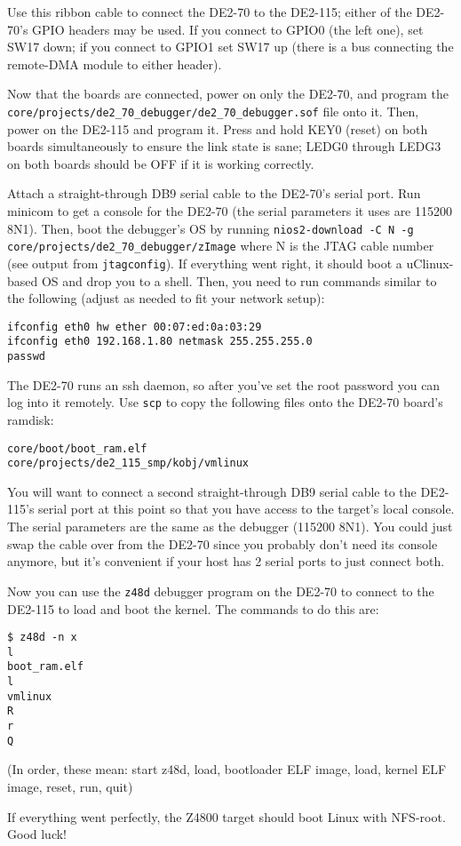 Use this ribbon cable to connect the DE2-70 to the DE2-115; either of the
DE2-70's GPIO headers may be used. If you connect to GPIO0 (the left one), set
SW17 down; if you connect to GPIO1 set SW17 up (there is a bus 
connecting the remote-DMA module to either header).

Now that the boards are connected, power on only the DE2-70, and program the
\verb+core/projects/de2_70_debugger/de2_70_debugger.sof+
file onto it. Then, power on the DE2-115 and program it. Press and hold KEY0
(reset) on both boards simultaneously to ensure the link state is sane; LEDG0
through LEDG3 on both boards should be OFF if it is working correctly.

Attach a straight-through DB9 serial cable to the DE2-70's serial port. Run
minicom to get a console for the DE2-70 (the serial parameters it uses are
115200 8N1).  Then, boot the debugger's OS by running
\verb+nios2-download -C N -g core/projects/de2_70_debugger/zImage+
where N is the JTAG cable number (see output from \verb+jtagconfig+).  If
everything went right, it should boot a uClinux-based OS and drop you to a
shell. Then, you need to run commands similar to the following (adjust as
needed to fit your network setup):

\begin{verbatim}
ifconfig eth0 hw ether 00:07:ed:0a:03:29
ifconfig eth0 192.168.1.80 netmask 255.255.255.0
passwd
\end{verbatim}

The DE2-70 runs an ssh daemon, so after you've set the root password you can
log into it remotely. Use \verb+scp+ to copy the following files onto the
DE2-70 board's ramdisk:

\begin{verbatim}
core/boot/boot_ram.elf
core/projects/de2_115_smp/kobj/vmlinux
\end{verbatim}

You will want to connect a second straight-through DB9 serial cable to the
DE2-115's serial port at this point so that you have access to the target's
local console. The serial parameters are the same as the debugger (115200 8N1).
You could just swap the cable over from the DE2-70 since you probably don't
need its console anymore, but it's convenient if your host has 2 serial ports
to just connect both.

Now you can use the \verb+z48d+ debugger program on the DE2-70 to connect to
the DE2-115 to load and boot the kernel. The commands to do this are:

\begin{verbatim}
$ z48d -n x
l
boot_ram.elf
l
vmlinux
R
r
Q
\end{verbatim}
(In order, these mean: start z48d, load, bootloader ELF image, load, kernel ELF
image, reset, run, quit)

If everything went perfectly, the Z4800 target should boot Linux with NFS-root.
Good luck!
